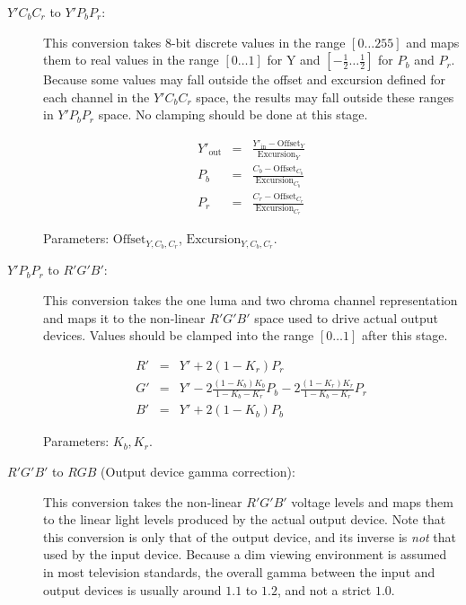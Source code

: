 \documentclass[11pt,letterpaper]{article}
\begin{document}
\begin{description}
\item[$Y'C_bC_r$ to $Y'P_bP_r$:]
\vspace{\baselineskip}\hfill

This conversion takes 8-bit discrete values in the range $[0\ldots255]$ and
 maps them to real values in the range $[0\ldots1]$ for Y and
 $[-\frac{1}{2}\ldots\frac{1}{2}]$ for $P_b$ and $P_r$.
Because some values may fall outside the offset and excursion defined for each
 channel in the $Y'C_bC_r$ space, the results may fall outside these ranges in
 $Y'P_bP_r$ space.
No clamping should be done at this stage.

\begin{eqnarray*}
Y'_\mathrm{out} & = &
 \frac{Y'_\mathrm{in}-\mathrm{Offset}_Y}{\mathrm{Excursion}_Y} \\
P_b             & = &
 \frac{C_b-\mathrm{Offset}_{C_b}}{\mathrm{Excursion}_{C_b}} \\
P_r             & = &
 \frac{C_r-\mathrm{Offset}_{C_r}}{\mathrm{Excursion}_{C_r}}
\end{eqnarray*}

Parameters: $\mathrm{Offset}_{Y,C_b,C_r}$, $\mathrm{Excursion}_{Y,C_b,C_r}$.

\item[$Y'P_bP_r$ to $R'G'B'$:]
\vspace{\baselineskip}\hfill

This conversion takes the one luma and two chroma channel representation and
 maps it to the non-linear $R'G'B'$ space used to drive actual output devices.
Values should be clamped into the range $[0\ldots1]$ after this stage.

\begin{eqnarray*}
R' & = & Y'+2(1-K_r)P_r \\
G' & = & Y'-2\frac{(1-K_b)K_b}{1-K_b-K_r}P_b-2\frac{(1-K_r)K_r}{1-K_b-K_r}P_r\\
B' & = & Y'+2(1-K_b)P_b
\end{eqnarray*}

Parameters: $K_b,K_r$.

\item[$R'G'B'$ to $RGB$ (Output device gamma correction):]
\vspace{\baselineskip}\hfill

This conversion takes the non-linear $R'G'B'$ voltage levels and maps them to
 the linear light levels produced by the actual output device.
Note that this conversion is only that of the output device, and its inverse is
 {\em not} that used by the input device.
Because a dim viewing environment is assumed in most television standards, the
 overall gamma between the input and output devices is usually around $1.1$ to
 $1.2$, and not a strict $1.0$.


\end{description}
\end{document}

